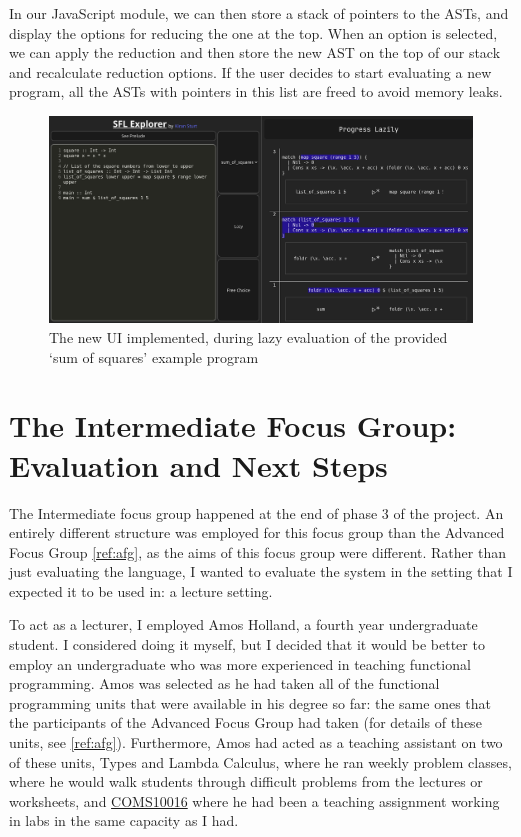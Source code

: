 In our JavaScript module, we can then store a stack of pointers to the \ac{AST}s, and display the options for reducing the one at the top. When an option is selected, we can apply the reduction and then store the new \ac{AST} on the top of our stack and recalculate reduction options. If the user decides to start evaluating a new program, all the \ac{AST}s with pointers in this list are freed to avoid memory leaks.

\begin{figure}[h]
    \centering
    \includegraphics[width=\linewidth]{images/phase-3-end.png}
    \caption{The new UI implemented, during lazy evaluation of the provided `sum of squares' example program}
    \label{screenshot:phase3_end_lazy}
\end{figure}

\section{The Intermediate Focus Group: Evaluation and Next Steps}
\label{eval:IFG}
The Intermediate focus group happened at the end of phase 3 of the project. An entirely different structure was employed for this focus group than the Advanced Focus Group \ref{ref:afg}, as the aims of this focus group were different. Rather than just evaluating the language, I wanted to evaluate the system in the setting that I expected it to be used in: a lecture setting. 

To act as a lecturer, I employed Amos Holland, a fourth year undergraduate student. I considered doing it myself, but I decided that it would be better to employ an undergraduate who was more experienced in teaching functional programming. Amos was selected as he had taken all of the functional programming units that were available in his degree so far: the same ones that the participants of the Advanced Focus Group had taken (for details of these units, see \ref{ref:afg}). Furthermore, Amos had acted as a teaching assistant on two of these units, Types and Lambda Calculus, where he ran weekly problem classes, where he would walk students through difficult problems from the lectures or worksheets, and \hyperref[COMS10016]{COMS10016} where he had been a teaching assignment working in labs in the same capacity as I had. 


